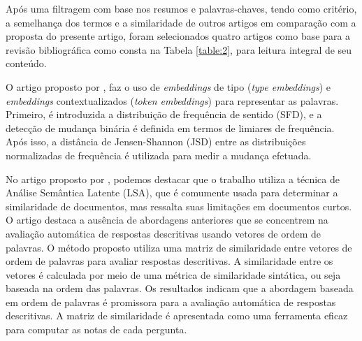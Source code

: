 
Após uma filtragem com base nos resumos e palavras-chaves, tendo como critério, a semelhança dos termos e a similaridade de outros artigos em comparação com a proposta do presente artigo, foram selecionados quatro artigos como base para a revisão bibliográfica como consta na Tabela \ref{table:2}, para leitura integral de seu conteúdo.

\begin{table}[htb!]
\caption{Tabela do funil de leitura.}
\label{table:2}
\end{table}

\newpage

O artigo proposto por \cite{UnsupervisedLexicalSemanticChangeDetection}, faz o uso de \textit{embeddings} de tipo (\textit{type embeddings}) e \textit{embeddings} contextualizados (\textit{token embeddings}) para representar as palavras. Primeiro, é introduzida a distribuição de frequência de sentido (SFD), e a detecção de mudança binária é definida em termos de limiares de frequência. Após isso, a distância de Jensen-Shannon (JSD) entre as distribuições normalizadas de frequência é utilizada para medir a mudança efetuada.
    
No artigo proposto por \cite{SyntacticSimilarityBasedSimilarityMatrixForEvaluatingDescriptiveAnswer}, podemos destacar que o trabalho utiliza a técnica de Análise Semântica Latente (LSA), que é comumente usada para determinar a similaridade de documentos, mas ressalta suas limitações em documentos curtos. O artigo destaca a ausência de abordagens anteriores que se concentrem na avaliação automática de respostas descritivas usando vetores de ordem de palavras. O método proposto utiliza uma matriz de similaridade entre vetores de ordem de palavras para avaliar respostas descritivas. A similaridade entre os vetores é calculada por meio de uma métrica de similaridade sintática, ou seja baseada na ordem das palavras. Os resultados indicam que a abordagem baseada em ordem de palavras é promissora para a avaliação automática de respostas descritivas. A matriz de similaridade é apresentada como uma ferramenta eficaz para computar as notas de cada pergunta.
    
